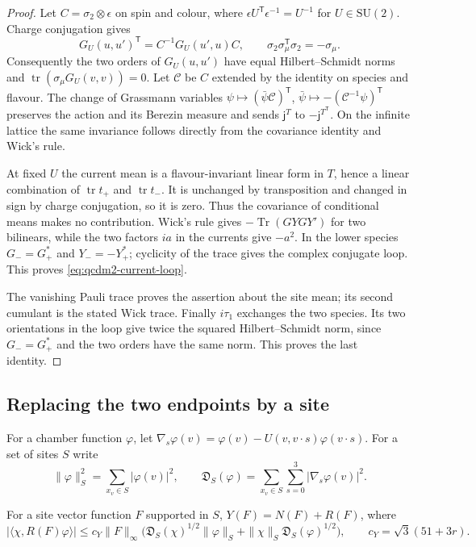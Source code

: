 \documentclass[11pt,letterpaper,reqno]{amsart}
\makeatletter
\theoremstyle{definition}
\newcommand{\ms@minorstart}{%
  \pushQED{\qed}\renewcommand{\qedsymbol}{$\blacksquare$}}
\newenvironment{lemma}[1][]{\ms@minorstart\ms@lemma[#1]}
  {\popQED\endms@lemma}
\theoremstyle{remark}
\makeatother
\begin{document}
\begin{proof}
Let $C=\sigma_2\otimes\epsilon$ on spin and colour, where
$\epsilon U^{\mathsf T}\epsilon^{-1}=U^{-1}$ for
$U\in\mathrm{SU}(2)$.  Charge conjugation gives
\[
 G_U(u,u')^{\mathsf T}=C^{-1}G_U(u',u)C,
 \qquad \sigma_2\sigma_\mu^{\mathsf T}\sigma_2=-\sigma_\mu.
\]
Consequently the two orders of $G_U(u,u')$ have equal
Hilbert--Schmidt norms and
$\operatorname{tr}(\sigma_\mu G_U(v,v))=0$.
Let $\mathcal C$ be $C$ extended by the identity on species and
flavour. The change of Grassmann variables
$\psi\mapsto(\bar\psi\mathcal C)^{\mathsf T}$,
$\bar\psi\mapsto-(\mathcal C^{-1}\psi)^{\mathsf T}$ preserves
the action and its Berezin measure and sends
$\mathsf j^T$ to $-\mathsf j^{T^{\mathsf T}}$.
On the infinite lattice the same invariance follows directly
from the covariance identity and Wick's rule.

At fixed $U$ the current mean is a flavour-invariant linear
form in $T$, hence a linear combination of
$\operatorname{tr}t_+$ and $\operatorname{tr}t_-$.
It is unchanged by transposition and changed in sign by
charge conjugation, so it is zero.  Thus the covariance
of conditional means makes no contribution.  Wick's rule
gives $-\operatorname{Tr}(GYGY')$ for two bilinears, while
the two factors $ia$ in the currents give $-a^2$.
In the lower species $G_-=G_+^*$ and $Y_-=-Y_+^*$;
cyclicity of the trace gives the complex conjugate loop.
This proves \eqref{eq:qcdm2-current-loop}.

The vanishing Pauli trace proves the assertion about the
site mean; its second cumulant is the stated Wick trace.
Finally $i\tau_1$ exchanges the two species.  Its two
orientations in the loop give twice the squared
Hilbert--Schmidt norm, since $G_-=G_+^*$ and the two
orders have the same norm.  This proves the last identity.
\end{proof}

\subsection{Replacing the two endpoints by a site}

For a chamber function $\varphi$, let
$\nabla_s\varphi(v)=\varphi(v)-U(v,v\cdot s)\varphi(v\cdot s)$.
For a set of sites $S$ write
\[
 \|\varphi\|_S^2=\sum_{x_v\in S}|\varphi(v)|^2,
 \qquad
 \mathfrak D_S(\varphi)=\sum_{x_v\in S}\sum_{s=0}^3
                                      |\nabla_s\varphi(v)|^2.
\]

\begin{lemma}\label{C-417-4}
For a site vector function $F$ supported in $S$,
$Y(F)=N(F)+R(F)$, where
\begin{equation}\label{eq:qcdm2-current-vertex-error}
 |\langle\chi,R(F)\varphi\rangle|
 \le c_Y\|F\|_\infty\bigl(
       \mathfrak D_S(\chi)^{1/2}\|\varphi\|_S
       +\|\chi\|_S\mathfrak D_S(\varphi)^{1/2}\bigr),
 \qquad c_Y=\sqrt3(51+3r).
\end{equation}
\end{lemma}
\end{document}
